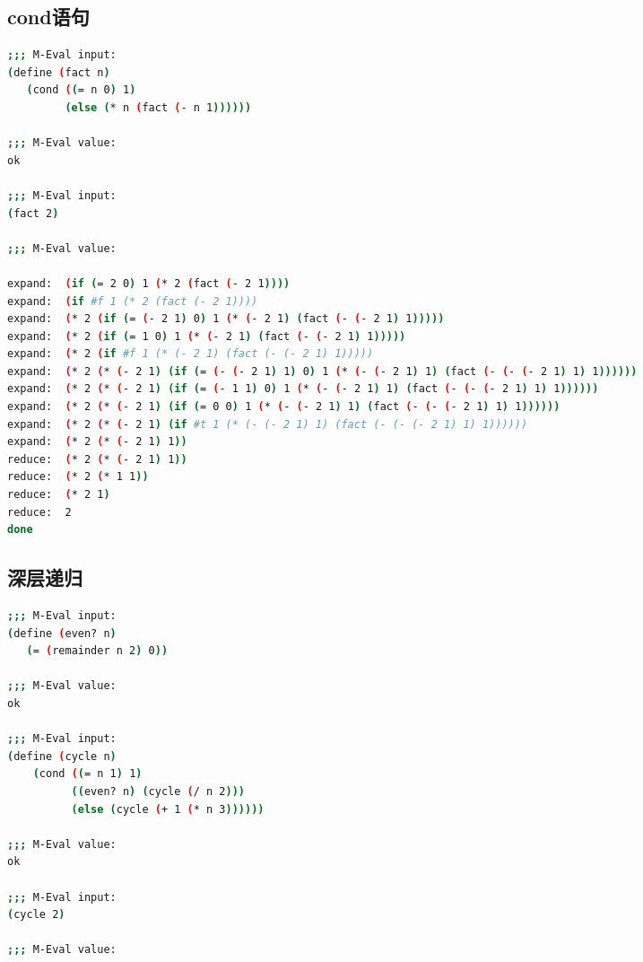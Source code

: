 \documentclass{article}
\begin{document}
\begin{CJK*}{UTF8}{gkai}
\begin{lstlisting}[language=bash, numbers=none, backgroundcolor=\color{black}, basicstyle=\scriptsize\color{green}\ttfamily\bfseries]
\end{lstlisting}

\subsection{cond语句}

\begin{lstlisting}[language=bash, numbers=none, backgroundcolor=\color{black}, basicstyle=\scriptsize\color{green}\ttfamily\bfseries]
;;; M-Eval input:
(define (fact n)
   (cond ((= n 0) 1)
         (else (* n (fact (- n 1))))))

;;; M-Eval value:
ok

;;; M-Eval input:
(fact 2)

;;; M-Eval value:

expand:  (if (= 2 0) 1 (* 2 (fact (- 2 1))))
expand:  (if #f 1 (* 2 (fact (- 2 1))))
expand:  (* 2 (if (= (- 2 1) 0) 1 (* (- 2 1) (fact (- (- 2 1) 1)))))
expand:  (* 2 (if (= 1 0) 1 (* (- 2 1) (fact (- (- 2 1) 1)))))
expand:  (* 2 (if #f 1 (* (- 2 1) (fact (- (- 2 1) 1)))))
expand:  (* 2 (* (- 2 1) (if (= (- (- 2 1) 1) 0) 1 (* (- (- 2 1) 1) (fact (- (- (- 2 1) 1) 1))))))
expand:  (* 2 (* (- 2 1) (if (= (- 1 1) 0) 1 (* (- (- 2 1) 1) (fact (- (- (- 2 1) 1) 1))))))
expand:  (* 2 (* (- 2 1) (if (= 0 0) 1 (* (- (- 2 1) 1) (fact (- (- (- 2 1) 1) 1))))))
expand:  (* 2 (* (- 2 1) (if #t 1 (* (- (- 2 1) 1) (fact (- (- (- 2 1) 1) 1))))))
expand:  (* 2 (* (- 2 1) 1))
reduce:  (* 2 (* (- 2 1) 1))
reduce:  (* 2 (* 1 1))
reduce:  (* 2 1)
reduce:  2
done

\end{lstlisting}

\subsection{深层递归}

\begin{lstlisting}[language=bash, numbers=none, backgroundcolor=\color{black}, basicstyle=\scriptsize\color{green}\ttfamily\bfseries]
;;; M-Eval input:
(define (even? n)
   (= (remainder n 2) 0))

;;; M-Eval value:
ok

;;; M-Eval input:
(define (cycle n)
    (cond ((= n 1) 1)
          ((even? n) (cycle (/ n 2)))
          (else (cycle (+ 1 (* n 3))))))

;;; M-Eval value:
ok

;;; M-Eval input:
(cycle 2)

;;; M-Eval value:


\end{lstlisting}
\end{CJK*}
\end{document}
